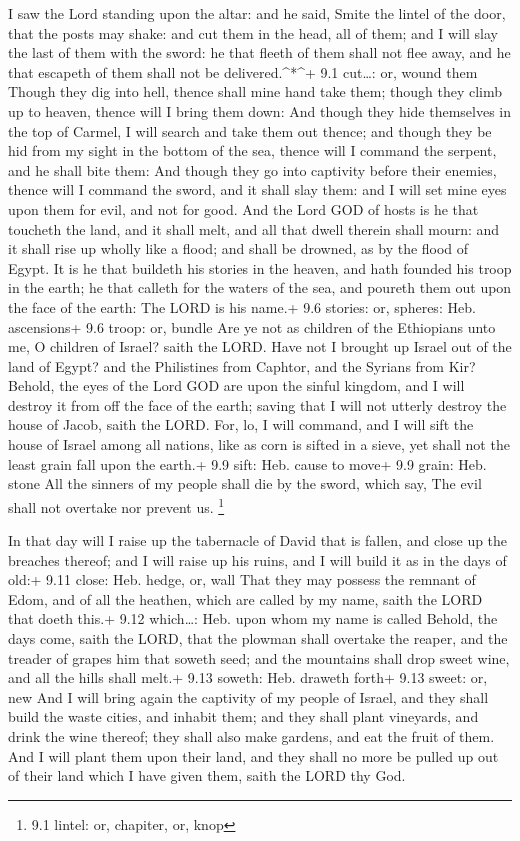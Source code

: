  I saw the Lord standing upon the altar: and he said, Smite
the lintel of the door, that the posts may shake: and cut them in the
head, all of them; and I will slay the last of them with the sword: he
that fleeth of them shall not flee away, and he that escapeth of them
shall not be delivered.\^{}*\^{}+ 9.1 cut\ldots: or, wound them
 Though they dig into hell, thence shall mine hand take
them; though they climb up to heaven, thence will I bring them down:
 And though they hide themselves in the top of Carmel, I
will search and take them out thence; and though they be hid from my
sight in the bottom of the sea, thence will I command the serpent, and
he shall bite them:  And though they go into captivity
before their enemies, thence will I command the sword, and it shall slay
them: and I will set mine eyes upon them for evil, and not for good.
 And the Lord GOD of hosts is he that toucheth the land, and
it shall melt, and all that dwell therein shall mourn: and it shall rise
up wholly like a flood; and shall be drowned, as by the flood of Egypt.
 It is he that buildeth his stories in the heaven, and hath
founded his troop in the earth; he that calleth for the waters of the
sea, and poureth them out upon the face of the earth: The LORD is his
name.+ 9.6 stories: or, spheres: Heb. ascensions+ 9.6 troop: or, bundle
 Are ye not as children of the Ethiopians unto me, O
children of Israel? saith the LORD. Have not I brought up Israel out of
the land of Egypt? and the Philistines from Caphtor, and the Syrians
from Kir?  Behold, the eyes of the Lord GOD are upon the
sinful kingdom, and I will destroy it from off the face of the earth;
saving that I will not utterly destroy the house of Jacob, saith the
LORD.  For, lo, I will command, and I will sift the house of
Israel among all nations, like as corn is sifted in a sieve, yet shall
not the least grain fall upon the earth.+ 9.9 sift: Heb. cause to move+
9.9 grain: Heb. stone  All the sinners of my people shall
die by the sword, which say, The evil shall not overtake nor prevent us.
\footnote{9.1 lintel: or, chapiter, or, knop}

 In that day will I raise up the tabernacle of David that
is fallen, and close up the breaches thereof; and I will raise up his
ruins, and I will build it as in the days of old:+ 9.11 close: Heb.
hedge, or, wall  That they may possess the remnant of Edom,
and of all the heathen, which are called by my name, saith the LORD that
doeth this.+ 9.12 which\ldots: Heb. upon whom my name is called
 Behold, the days come, saith the LORD, that the plowman
shall overtake the reaper, and the treader of grapes him that soweth
seed; and the mountains shall drop sweet wine, and all the hills shall
melt.+ 9.13 soweth: Heb. draweth forth+ 9.13 sweet: or, new
 And I will bring again the captivity of my people of
Israel, and they shall build the waste cities, and inhabit them; and
they shall plant vineyards, and drink the wine thereof; they shall also
make gardens, and eat the fruit of them.  And I will plant
them upon their land, and they shall no more be pulled up out of their
land which I have given them, saith the LORD thy God.
